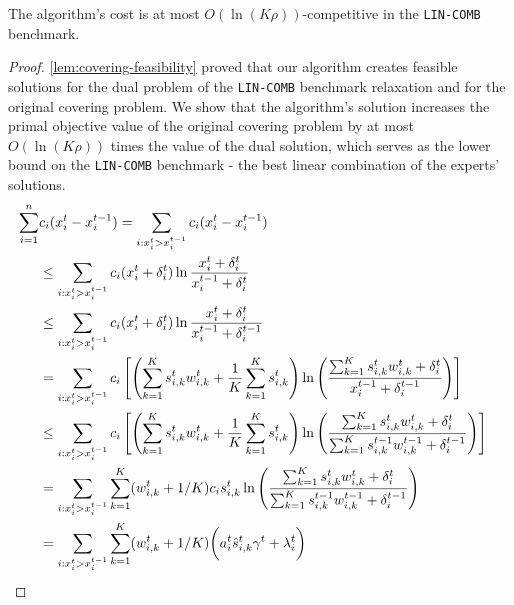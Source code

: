 \clearpage

\begin{theorem} \label{covering-theorem}
The algorithm's cost is at most $O(\ln(K \rho))$-competitive in the \texttt{LIN-COMB} benchmark.
\end{theorem}
%
\begin{proof} \cref{lem:covering-feasibility} proved that our algorithm creates feasible solutions for the dual problem of the \texttt{LIN-COMB} benchmark relaxation and for the original covering problem. We show that the algorithm's solution increases the primal objective value of the original covering problem by at most $O(\ln(K \rho))$ times the value of the dual solution, which serves as the lower bound on the \texttt{LIN-COMB} benchmark - the best linear combination of the experts' solutions.
\begin{align}
	 \sum_{i=1}^{n} &c_{i} (x_{i}^{t} - x_{i}^{t-1})
		= \sum_{i: x_{i}^{t} > x_{i}^{t-1}} c_{i}(x_{i}^{t} - x_{i}^{t-1}) &&  \notag \\
		&\leq \sum_{i: x_{i}^{t} > x_{i}^{t-1}} c_{i}(x_{i}^{t} + \delta_{i}^{t}) \ln \frac{x_{i}^{t} + \delta_{i}^{t}}{x_{i}^{t-1} + \delta_{i}^{t}} \\
		&\leq \sum_{i: x_{i}^{t} > x_{i}^{t-1}} c_{i} (x_{i}^{t} + \delta_{i}^{t}) \ln \frac{x_{i}^{t} + \delta_{i}^{t}}{x_{i}^{t-1} + \delta_{i}^{t-1}} \\
		&= \sum_{i: x_{i}^{t} > x_{i}^{t-1}} c_{i} \left[ \left(\sum_{k=1}^{K}  s_{i,k}^{t} w_{i,k}^{t} + \frac{1}{K} \sum_{k=1}^{K} s_{i,k}^{t} \right)
			\ln \left(\frac{ \sum_{k=1}^{K}  s_{i,k}^{t} w_{i,k}^{t} + \delta_{i}^{t}}{x_{i}^{t-1} + \delta_{i}^{t-1}}  \right) \right] \\
%
&\leq \sum_{i: x_{i}^{t} > x_{i}^{t-1}} c_{i} \left[ \left(\sum_{k=1}^{K}  s_{i,k}^{t} w_{i,k}^{t} + \frac{1}{K} \sum_{k=1}^{K} s_{i,k}^{t} \right)
			\ln \left(\frac{ \sum_{k=1}^{K}  s_{i,k}^{t} w_{i,k}^{t} + \delta_{i}^{t}}{\sum_{k=1}^{K}  s_{i,k}^{t-1} w_{i,k}^{t-1} + \delta_{i}^{t-1}}  \right) \right]\\
%
	&= \sum_{i: x_{i}^{t} > x_{i}^{t-1}} \sum_{k=1}^{K} (w_{i,k}^{t} + 1/K) c_{i} s_{i,k}^{t}
				\ln \left(\frac{ \sum_{k=1}^{K} s_{i,k}^{t} w_{i,k}^{t}  + \delta_{i}^{t}}{\sum_{k=1}^{K}  s_{i,k}^{t-1} w_{i,k}^{t-1}  + \delta_{i}^{t-1}}  \right) \notag \\
%
%
&=  \sum_{i: x_{i}^{t} > x_{i}^{t-1}} \sum_{k=1}^{K} (w_{i,k}^{t} + 1/K) \biggl( a_{i}^{t} \hat{s}_{i,k}^{t} \gamma^t + \lambda_{i}^{t} \biggr) \\

\end{align}
\end{proof}
